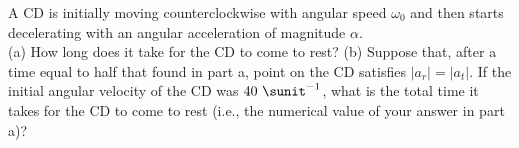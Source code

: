 A CD is initially moving counterclockwise with angular speed $\omega_0$ and then starts
decelerating with an angular acceleration of magnitude $\alpha$.\\
%
(a) How long does it take for the CD to come to rest?\answercheck\hwendpart
%
(b) Suppose that, after a time equal to half that found in part a,
point on the CD satisfies $|a_r|=|a_t|$.
If the initial angular velocity of the CD was $40\ \sunit^{-1}$, what is the
total time it takes for the CD to come to rest (i.e., the numerical
value of your answer in part a)?\answercheck
